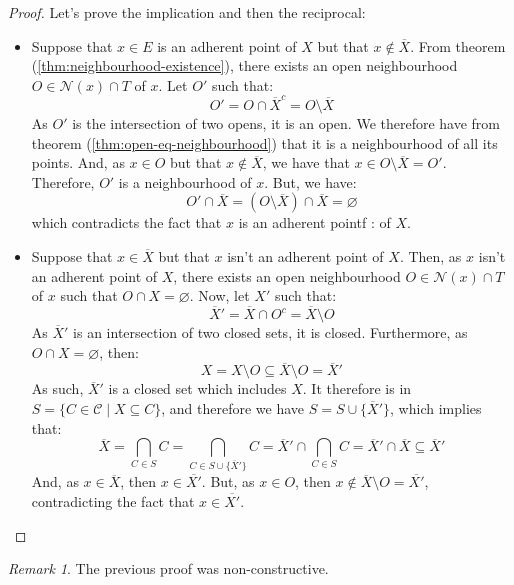 \documentclass{article}
\theoremstyle{definition}
\theoremstyle{remark}
\newtheorem*{remark}{Remark}
\theoremstyle{example}
\theoremstyle{notation}
\begin{document}
\begin{proof}
		Let's prove the implication and then the reciprocal:
		\begin{itemize}
				\item Suppose that $x \in E$ is an adherent point of $X$ but that $x \notin \overline{X}$. From theorem (\ref{thm:neighbourhood-existence}), there exists an open neighbourhood $O \in \mathcal{N}(x) \cap T$ of $x$. Let $O'$ such that:
						$$O' = O \cap \overline{X}^c = O \setminus \overline{X}$$
				As $O'$ is the intersection of two opens, it is an open. We therefore have from theorem (\ref{thm:open-eq-neighbourhood}) that it is a neighbourhood of all its points. And, as $x \in O$ but that $x \notin \overline{X}$, we have that $x \in O \setminus \overline{X} = O'$. Therefore, $O'$ is a neighbourhood of $x$. But, we have:
						$$O' \cap \overline{X} = (O \setminus \overline{X}) \cap \overline{X} = \varnothing$$
				which contradicts the fact that $x$ is an adherent pointf :  of $X$.
				\item Suppose that $x \in \overline{X}$ but that $x$ isn't an adherent point of $X$. Then, as $x$ isn't an adherent point of $X$, there exists an open neighbourhood $O \in \mathcal{N}(x) \cap T$ of $x$ such that $O \cap X = \varnothing$. Now, let $X'$ such that:
						$$\overline{X}' = \overline{X} \cap O^c = \overline{X} \setminus O$$
				As $\overline{X}'$ is an intersection of two closed sets, it is closed. Furthermore, as $O \cap X = \varnothing$, then:
						$$X = X \setminus O \subseteq \overline{X} \setminus O = \overline{X}'$$
				As such, $\overline{X}'$ is a closed set which includes $X$. It therefore is in $S = \{C \in \mathcal{C} \mid X \subseteq C\}$, and therefore we have $S = S \cup \{\overline{X}'\}$, which implies that:
						$$\overline{X} = \bigcap_{C \in S} C = \bigcap_{C \in S \cup \{\overline{X}'\}} C = \overline{X}' \cap \bigcap_{C \in S} C = \overline{X}' \cap \overline{X} \subseteq \overline{X}'$$
				And, as $x \in \overline{X}$, then $x \in \overline{X'}$. But, as $x \in O$, then $x \notin \overline{X} \setminus O = \overline{X'}$, contradicting the fact that $x \in \overline{X'}$.
		\end{itemize}
\end{proof}

\begin{remark}
		The previous proof was non-constructive.
\end{remark}
\end{document}
